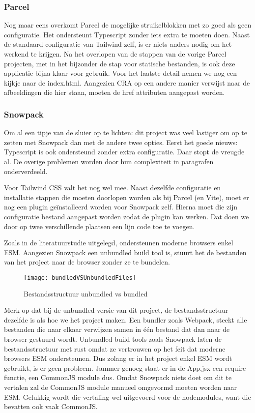 \subsubsection{Parcel}

Nog maar eens overkomt Parcel de mogelijke struikelblokken met zo goed als geen configuratie. Het ondersteunt Typescript zonder iets extra te moeten doen. Naast de standaard configuratie van Tailwind zelf, is er niets anders nodig om het werkend te krijgen. Na het overlopen van de stappen van de vorige Parcel projecten, met in het bijzonder de stap voor statische bestanden, is ook deze applicatie bijna klaar voor gebruik. Voor het laatste detail nemen we nog een kijkje naar de index.html. Aangezien CRA op een andere manier verwijst naar de afbeeldingen die hier staan, moeten de href attributen aangepast worden.

\subsubsection{Snowpack}
Om al een tipje van de sluier op te lichten: dit project was veel lastiger om op te zetten met Snowpack dan met de andere twee opties. Eerst het goede nieuws: Typescript is ook ondersteund zonder extra configuratie. Daar stopt de vreugde al. De overige problemen worden door hun complexiteit in paragrafen onderverdeeld. 

Voor Tailwind CSS valt het nog wel mee. Naast dezelfde configuratie en installatie stappen die moeten doorlopen worden als bij Parcel (en Vite), moet er nog een plugin geïnstalleerd worden voor Snowpack zelf. Hierna moet die zijn configuratie bestand aangepast worden zodat de plugin kan werken. Dat doen we door op twee verschillende plaatsen een lijn code toe te voegen. 

Zoals in de literatuurstudie uitgelegd, ondersteunen moderne browsers enkel ESM. Aangezien Snowpack een unbundled build tool is, stuurt het de bestanden van het project naar de browser zonder ze te bundelen. 

\begin{figure}[h]
    \texttt{[image: bundledVSUnbundledFiles]}
        \centering
        \caption[]{Bestandsstructuur unbundled vs bundled}
    \end{figure}

    Merk op dat bij de unbundled versie van dit project, de bestandsstructuur dezelfde is als hoe we het project maken. Een bundler zoals Webpack, steekt alle bestanden die naar elkaar verwijzen samen in één bestand dat dan naar de browser gestuurd wordt. Unbundled build tools zoals Snowpack laten de bestandsstructuur met rust omdat ze vertrouwen op het feit dat moderne browsers ESM ondersteunen. Dus zolang er in het project enkel ESM wordt gebruikt, is er geen probleem. Jammer genoeg staat er in de App.jsx een require functie, een CommonJS module dus. Omdat Snowpack niets doet om dit te vertalen zal de CommonJS module manueel omgevormd moeten worden naar ESM. Gelukkig wordt die vertaling wel uitgevoerd voor de nodemodules, want die bevatten ook vaak CommonJS.

